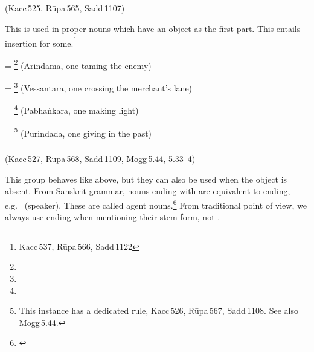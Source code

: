 \subparagraph*{} (Kacc\,525, R\=upa\,565, Sadd\,1107)\label{pacck1:a1}

This is used in proper nouns which have an object as the first part. This entails  insertion for some.\footnote{Kacc\,537, R\=upa\,566, Sadd\,1122}

 = \footnote{} (Arindama, one taming the enemy)\par
{} = \footnote{} (Vessantara, one crossing the merchant's lane)\par
{} = \footnote{} (Pabha\.nkara, one making light)\par
{} = \footnote{ This instance has a dedicated rule, Kacc\,526, R\=upa\,567, Sadd\,1108. See also Mogg\,5.44.} (Purindada, one giving in the past)\par

\subparagraph*{} (Kacc\,527, R\=upa\,568, Sadd\,1109, Mogg\,5.44, 5.33--4)\label{pacck1:a2}\label{pacck1:dnavu}\label{pacck1:dnaka}\label{pacck1:tu}\label{pacck1:ltu}\label{pacck1:aavii}

This group behaves like above, but they can also be used when the object is absent. From Sanskrit grammar, nouns ending with  are equivalent to  ending, e.g.\  (speaker). These are called agent nouns.\footnote{\citealp[p.~209]{warder:intro}} From traditional point of view, we always use  ending when mentioning their stem form, not .

